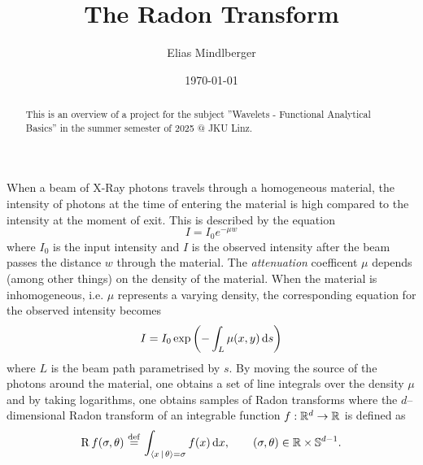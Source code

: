 \documentclass[a4paper,12pt]{amsart}
\begin{document}
\title{The Radon Transform}
\author{Elias Mindlberger}


\date{\today}

\begin{abstract}
    This is an overview of a project for the subject ''Wavelets - Functional Analytical Basics'' in the summer semester of 2025 @ JKU Linz.
\end{abstract}

\maketitle


When a beam of X-Ray photons travels through a homogeneous material, the intensity of photons at the time of entering the material is high compared to the intensity at the moment of exit. This is described by the equation
\[
    I = I_0 e^{-\mu w}
\]
where \(I_0\) is the input intensity and 
\(I\) is the observed intensity after the beam passes the 
distance \(w\) through the material. The \emph{attenuation} coefficent \(\mu\) 
depends (among other things) on the density of the material.
When the material is inhomogeneous, i.e. \(\mu\) represents a varying density, the 
corresponding equation for the observed intensity becomes \[
    I = I_0 \exp \left( - \int_{L}^{} \mu(x,y)\, \mathrm{d} s \right)
\]
where \(L\) is the beam path parametrised by \(s\). By moving the source of the photons around the material, one obtains a set of line integrals over the density \(\mu\) and by taking logarithms, one obtains
samples of Radon transforms where the \(d\)--dimensional Radon transform of an integrable function \(f: \mathbb{R}^d \to \mathbb{R}\) is defined as
\[
    \operatorname{R} f(\sigma, \theta) \operatorname{\, \stackrel{def}{=} \,} \int_{\left\langle x\, \mid\, \theta \right\rangle = \sigma}^{} f(x)\, \mathrm{d} x,\qquad (\sigma, \theta) \in \mathbb{R} \times \mathbb{S}^{d-1}.
\]
\end{document}
